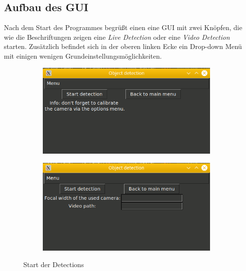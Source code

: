 \documentclass[12pt]{article}
\theoremstyle{definition}
\begin{document}
\subsection{Aufbau des GUI}
\begin{flushleft}
Nach dem Start des Programmes begrüßt einen eine GUI mit zwei Knöpfen, die wie die Beschriftungen zeigen eine \textit{Live Detection} oder eine \textit{Video Detection} starten. Zusätzlich befindet sich in der oberen linken Ecke ein Drop-down Menü mit einigen wenigen Grundeinstellungsmöglichkeiten.
\end{flushleft}

\begin{figure}[h]
\begin{subfigure}[t]{0.5\textwidth}
	\centering
	\includegraphics[scale=0.5]{gui_live_detect}
	\label{fig:gui_live_det}
\end{subfigure}%
\begin{subfigure}[t]{0.5\textwidth}
	\centering
	\includegraphics[scale=0.5]{gui_video_detect}
	\label{fig:gui_vid_det}
\end{subfigure}%
\caption{Start der Detections}
\label{fig:gui_detects}
\end{figure}
\end{document}
